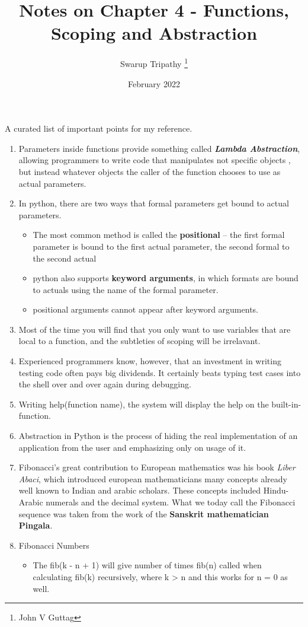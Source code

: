 \documentclass[11pt]{article}
\title{Notes on Chapter 4 - Functions, Scoping and Abstraction}
\author{Swarup Tripathy \thanks{John V Guttag}}
\date{February 2022}
\begin{document}
    \maketitle
    A curated list of important points for my reference.
    \begin{enumerate}
        \item Parameters inside functions provide something called \textbf{\textit{Lambda Abstraction}}, allowing programmers to write code that manipulates not specific objects
        , but instead whatever objects the caller of the function chooses to use as actual parameters.
        \item In python, there are two ways that formal parameters get bound to actual parameters. 
        \begin{itemize}
            \item The most common method is called the \textbf{positional} -- the first formal parameter is bound to the first actual parameter, the second formal to the second actual
            \item python also supports \textbf{keyword arguments}, in which formats are bound to actuals using the name of the formal parameter.
            \item positional arguments cannot appear after keyword arguments.
        \end{itemize}
        \item Most of the time you will find that you only want to use variables that are local to a function, and the subtleties of scoping will be irrelavant.
        \item Experienced programmers know, however, that an investment in writing testing code often pays big dividends. It certainly beats typing test cases into the shell over and over again during debugging.
        \item Writing help(function name), the system will display the help on the built-in-function.
        \item Abstraction in Python is the process of hiding the real implementation of an application from the user and emphasizing only on usage of it.
        \item Fibonacci's great contribution to European mathematics was his book \textit{Liber Abaci}, which introduced european mathematicians many concepts already well known to Indian and arabic scholars. 
        These concepts included Hindu-Arabic numerals and the decimal system. What we today call the Fibonacci sequence was taken from the work of the \textbf{Sanskrit mathematician Pingala}.
        \item Fibonacci Numbers
        \begin{itemize}
            \item The fib(k - n + 1) will give number of times fib(n) called when calculating fib(k) recursively, where k > n and this works for n = 0 as well.
        \end{itemize}
    \end{enumerate}
\end{document}
